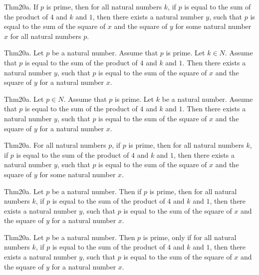\documentclass{article}
\begin{document}
Thm20a. If $p$ is prime, then for all natural numbers $k$, if $p$ is equal to the sum of the product of $4$ and $k$ and $1$, then there exists a natural number $y$, such that $p$ is equal to the sum of the square of $x$ and the square of $y$ for some natural number $x$ for all natural numbers $p$.

Thm20a. Let $p$ be a natural number. Assume that $p$ is prime. Let $k \in N$. Assume that $p$ is equal to the sum of the product of $4$ and $k$ and $1$. Then there exists a natural number $y$, such that $p$ is equal to the sum of the square of $x$ and the square of $y$ for a natural number $x$.

Thm20a. Let $p \in N$. Assume that $p$ is prime. Let $k$ be a natural number. Assume that $p$ is equal to the sum of the product of $4$ and $k$ and $1$. Then there exists a natural number $y$, such that $p$ is equal to the sum of the square of $x$ and the square of $y$ for a natural number $x$.

Thm20a. For all natural numbers $p$, if $p$ is prime, then for all natural numbers $k$, if $p$ is equal to the sum of the product of $4$ and $k$ and $1$, then there exists a natural number $y$, such that $p$ is equal to the sum of the square of $x$ and the square of $y$ for some natural number $x$.

Thm20a. Let $p$ be a natural number. Then if $p$ is prime, then for all natural numbers $k$, if $p$ is equal to the sum of the product of $4$ and $k$ and $1$, then there exists a natural number $y$, such that $p$ is equal to the sum of the square of $x$ and the square of $y$ for a natural number $x$.

Thm20a. Let $p$ be a natural number. Then $p$ is prime, only if for all natural numbers $k$, if $p$ is equal to the sum of the product of $4$ and $k$ and $1$, then there exists a natural number $y$, such that $p$ is equal to the sum of the square of $x$ and the square of $y$ for a natural number $x$.
\end{document}
